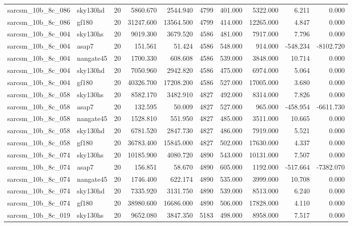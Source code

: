 \begin{tabular}{llrrrrrrrr}
sarcsm\_10b\_8c\_086 & sky130hd & 20 & 5860.670 & 2544.940 & 4799 & 401.000 & 5322.000 & 6.211 & 0.000 \\
sarcsm\_10b\_8c\_086 & gf180 & 20 & 31247.600 & 13564.500 & 4799 & 414.000 & 12265.000 & 4.847 & 0.000 \\
sarcsm\_10b\_8c\_004 & sky130hs & 20 & 9019.300 & 3679.520 & 4586 & 481.000 & 7917.000 & 7.796 & 0.000 \\
sarcsm\_10b\_8c\_004 & asap7 & 20 & 151.561 & 51.424 & 4586 & 548.000 & 914.000 & -548.234 & -8102.720 \\
sarcsm\_10b\_8c\_004 & nangate45 & 20 & 1700.330 & 608.608 & 4586 & 539.000 & 3848.000 & 10.714 & 0.000 \\
sarcsm\_10b\_8c\_004 & sky130hd & 20 & 7050.960 & 2942.820 & 4586 & 475.000 & 6974.000 & 5.064 & 0.000 \\
sarcsm\_10b\_8c\_004 & gf180 & 20 & 40326.700 & 17208.200 & 4586 & 527.000 & 17005.000 & 3.680 & 0.000 \\
sarcsm\_10b\_8c\_058 & sky130hs & 20 & 8582.170 & 3482.910 & 4827 & 492.000 & 8314.000 & 7.826 & 0.000 \\
sarcsm\_10b\_8c\_058 & asap7 & 20 & 132.595 & 50.009 & 4827 & 527.000 & 965.000 & -458.954 & -6611.730 \\
sarcsm\_10b\_8c\_058 & nangate45 & 20 & 1528.810 & 551.950 & 4827 & 485.000 & 3511.000 & 10.665 & 0.000 \\
sarcsm\_10b\_8c\_058 & sky130hd & 20 & 6781.520 & 2847.730 & 4827 & 486.000 & 7919.000 & 5.521 & 0.000 \\
sarcsm\_10b\_8c\_058 & gf180 & 20 & 36783.400 & 15845.000 & 4827 & 502.000 & 17630.000 & 4.337 & 0.000 \\
sarcsm\_10b\_8c\_074 & sky130hs & 20 & 10185.900 & 4080.720 & 4890 & 543.000 & 10131.000 & 7.507 & 0.000 \\
sarcsm\_10b\_8c\_074 & asap7 & 20 & 156.851 & 58.670 & 4890 & 605.000 & 1192.000 & -517.664 & -7382.070 \\
sarcsm\_10b\_8c\_074 & nangate45 & 20 & 1746.400 & 622.174 & 4890 & 535.000 & 3999.000 & 10.708 & 0.000 \\
sarcsm\_10b\_8c\_074 & sky130hd & 20 & 7335.920 & 3131.750 & 4890 & 539.000 & 8513.000 & 6.240 & 0.000 \\
sarcsm\_10b\_8c\_074 & gf180 & 20 & 38980.600 & 16686.000 & 4890 & 506.000 & 17828.000 & 4.110 & 0.000 \\
sarcsm\_10b\_8c\_019 & sky130hs & 20 & 9652.080 & 3847.350 & 5183 & 498.000 & 8958.000 & 7.517 & 0.000 \\

\end{tabular}
